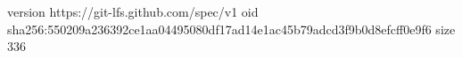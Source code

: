 version https://git-lfs.github.com/spec/v1
oid sha256:550209a236392ce1aa04495080df17ad14e1ac45b79adcd3f9b0d8efcff0e9f6
size 336
